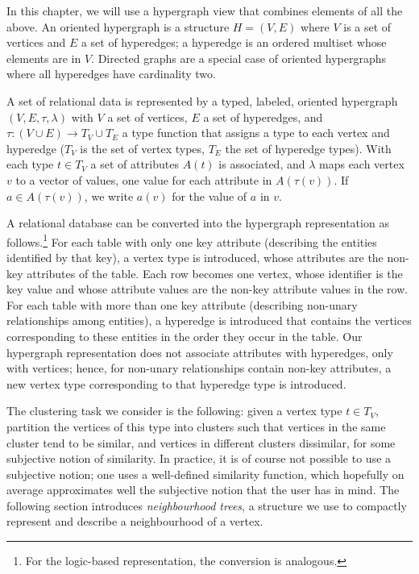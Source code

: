 In this chapter, we will use a hypergraph view that combines elements of all the above.
An oriented hypergraph is a structure $H=(V,E)$ where $V$ is a set of vertices and $E$ a set of hyperedges; a hyperedge is an ordered multiset whose elements are in $V$.  
Directed graphs are a special case of oriented hypergraphs where all hyperedges have cardinality two.


A set of relational data is represented by a typed, labeled, oriented hypergraph $(V,E,\tau,\lambda)$ with $V$ a set of vertices, $E$ a set of hyperedges, and $\tau: (V \cup E) \rightarrow T_V \cup T_E$  a type function that assigns a type to each vertex and hyperedge ($T_V$ is the set of vertex types, $T_E$ the set of hyperedge types).  
With each type $t \in T_V$ a set of attributes $A(t)$ is associated, and $\lambda$ maps each vertex $v$ to a vector of values, one value for each attribute in $A(\tau(v))$.  
If $a \in A(\tau(v))$, we write $a(v)$ for the value of $a$ in $v$.


A relational database can be converted into the hypergraph representation as follows.\footnote{For the logic-based representation, the conversion is analogous.}  
For each table with only one key attribute (describing the entities identified by that key), a vertex type is introduced, whose attributes are the non-key attributes of the table.   
Each row becomes one vertex, whose identifier is the key value and whose attribute values are the non-key attribute values in the row.  
For each table with more than one key attribute (describing non-unary relationships among entities), a hyperedge is introduced that contains the vertices corresponding to these entities in the order they occur in the table.  
Our hypergraph representation does not associate attributes with hyperedges, only with vertices; hence, for non-unary relationships contain non-key attributes, a new vertex type corresponding to that hyperedge type is introduced.


The clustering task we consider is the following: given a vertex type $t \in T_V$, partition the vertices of this type into clusters such that vertices in the same cluster tend to be similar, and vertices in different clusters dissimilar, for some subjective notion of similarity.  
In practice, it is of course not possible to use a subjective notion; one uses a well-defined similarity function, which hopefully on average approximates well the subjective notion that the user has in mind. 
The following section introduces \textit{neighbourhood trees}, a structure we use to compactly represent and describe a neighbourhood of a vertex.







